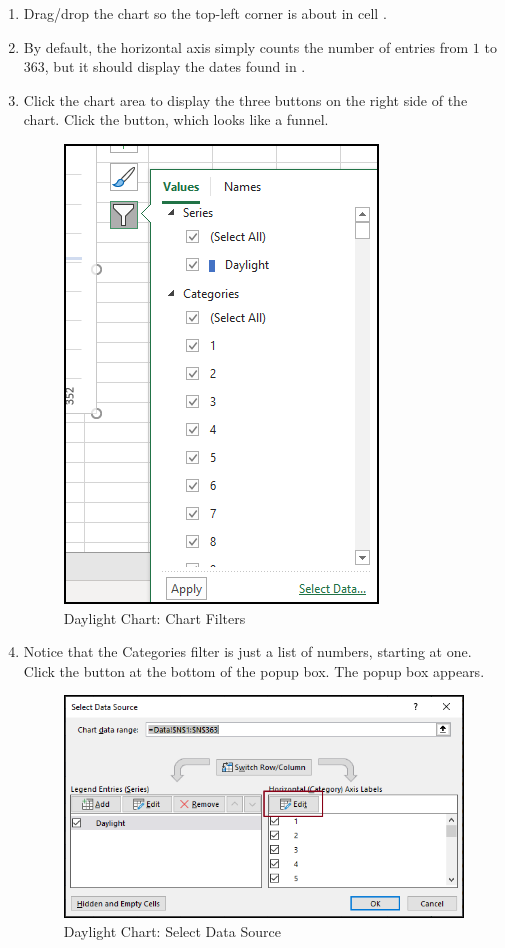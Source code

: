 \begin{enumerate}
	\item Drag/drop the chart so the top-left corner is about in cell .
	\item By default, the horizontal axis simply counts the number of entries from $ 1 $ to $ 363 $, but it should display the dates found in .
	\item Click the chart area to display the three buttons on the right side of the chart. Click the  button, which looks like a funnel.
	
	\begin{figure}[H]
		\centering
		\includegraphics[width=\maxwidth{.95\linewidth}]{gfx/ch09_fig90}
		\caption{Daylight Chart: Chart Filters}
		\label{09:fig90}
	\end{figure}

	\item Notice that the Categories filter is just a list of numbers, starting at one. Click the  button at the bottom of the  popup box. The  popup box appears.

	\begin{figure}[H]
		\centering
		\includegraphics[width=\maxwidth{.95\linewidth}]{gfx/ch09_fig91}
		\caption{Daylight Chart: Select Data Source}
		\label{09:fig91}
	\end{figure}
	

\end{enumerate}

